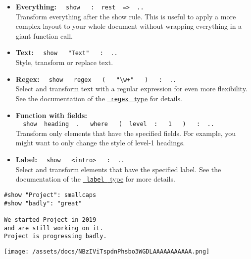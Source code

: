 \begin{itemize}
\item
  \textbf{Everything:}
  \texttt{\ }{\texttt{\ show\ }}\texttt{\ }{\texttt{\ :\ }}\texttt{\ rest\ }{\texttt{\ =\textgreater{}\ }}\texttt{\ ..\ }\\
  Transform everything after the show rule. This is useful to apply a
  more complex layout to your whole document without wrapping everything
  in a giant function call.
\item
  \textbf{Text:}
  \texttt{\ }{\texttt{\ show\ }}\texttt{\ }{\texttt{\ "Text"\ }}\texttt{\ }{\texttt{\ :\ }}\texttt{\ ..\ }\\
  Style, transform or replace text.
\item
  \textbf{Regex:}
  \texttt{\ }{\texttt{\ show\ }}\texttt{\ }{\texttt{\ regex\ }}\texttt{\ }{\texttt{\ (\ }}\texttt{\ }{\texttt{\ "\textbackslash{}w+"\ }}\texttt{\ }{\texttt{\ )\ }}\texttt{\ }{\texttt{\ :\ }}\texttt{\ ..\ }\\
  Select and transform text with a regular expression for even more
  flexibility. See the documentation of the
  \href{/docs/reference/foundations/regex/}{\texttt{\ regex\ } type} for
  details.
\item
  \textbf{Function with fields:}
  \texttt{\ }{\texttt{\ show\ }}\texttt{\ heading\ }{\texttt{\ .\ }}\texttt{\ }{\texttt{\ where\ }}\texttt{\ }{\texttt{\ (\ }}\texttt{\ level\ }{\texttt{\ :\ }}\texttt{\ }{\texttt{\ 1\ }}\texttt{\ }{\texttt{\ )\ }}\texttt{\ }{\texttt{\ :\ }}\texttt{\ ..\ }\\
  Transform only elements that have the specified fields. For example,
  you might want to only change the style of level-1 headings.
\item
  \textbf{Label:}
  \texttt{\ }{\texttt{\ show\ }}\texttt{\ }{\texttt{\ \textless{}intro\textgreater{}\ }}\texttt{\ }{\texttt{\ :\ }}\texttt{\ ..\ }\\
  Select and transform elements that have the specified label. See the
  documentation of the
  \href{/docs/reference/foundations/label/}{\texttt{\ label\ } type} for
  more details.
\end{itemize}

\begin{verbatim}
#show "Project": smallcaps
#show "badly": "great"

We started Project in 2019
and are still working on it.
Project is progressing badly.
\end{verbatim}

\texttt{[image: /assets/docs/NBzIViTspdnPhsbo3WGDLAAAAAAAAAAA.png]}


